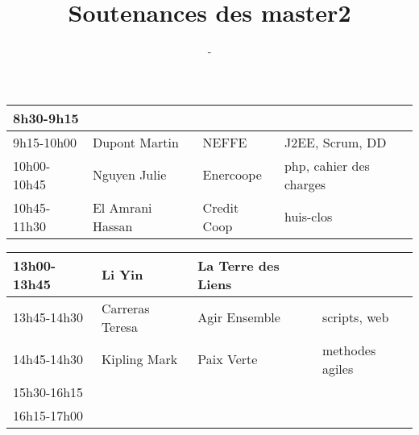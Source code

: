 \documentclass{article}
\title{\huge Soutenances des master2}
\author{\Huge \lemaster}
\date{\huge \ladate - \lasalle}
\begin{document}
\maketitle
\pagestyle{empty}
\Large

\hspace*{-3cm}\begin{tabular}[t]{|l|l|l|l|}\hline
8h30-9h15 & & &\\ \hline
9h15-10h00 & Dupont Martin & NEFFE & J2EE, Scrum, DD\\ \hline
10h00-10h45 & Nguyen Julie & Enercoope & php, cahier des charges\\ \hline
10h45-11h30 & El Amrani Hassan & Credit Coop & huis-clos\\ \hline
\end{tabular}

\bigskip
\hspace*{-3cm}\begin{tabular}[t]{|l|l|l|l|}
\hline
13h00-13h45 & Li Yin & La Terre des Liens &\\ \hline
13h45-14h30 & Carreras Teresa & Agir Ensemble & scripts, web\\ \hline
\hline
14h45-14h30 & Kipling Mark & Paix Verte & methodes agiles\\ \hline
15h30-16h15 & & &\\ \hline
16h15-17h00 & & &\\ \hline
\end{tabular}
\end{document}
